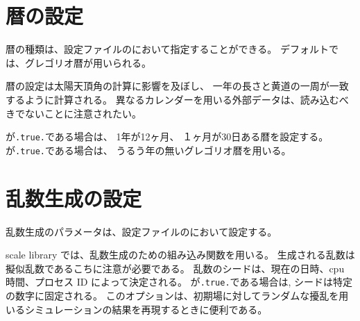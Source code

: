 \section{暦の設定} \label{subsec:calendar}

暦の種類は、設定ファイルのにおいて指定することができる。
デフォルトでは、グレゴリオ暦が用いられる。


\noindent
暦の設定は太陽天頂角の計算に影響を及ぼし、
一年の長さと黄道の一周が一致するように計算される。
異なるカレンダーを用いる外部データは、読み込むべきでないことに注意されたい。

が\verb|.true.|である場合は、
1年が12ヶ月、 １ヶ月が30日ある暦を設定する。
%
が\verb|.true.|である場合は、
うるう年の無いグレゴリオ暦を用いる。


\section{乱数生成の設定} \label{subsec:random}

乱数生成のパラメータは、設定ファイルのにおいて設定する。


\noindent
scale library では、乱数生成のための組み込み関数を用いる。
生成される乱数は擬似乱数であるこちに注意が必要である。
乱数のシードは、現在の日時、cpu 時間、プロセス ID によって決定される。
%
が\verb|.true.|である場合は, シードは特定の数字に固定される。
このオプションは、初期場に対してランダムな擾乱を用いるシミュレーションの結果を再現するときに便利である。



